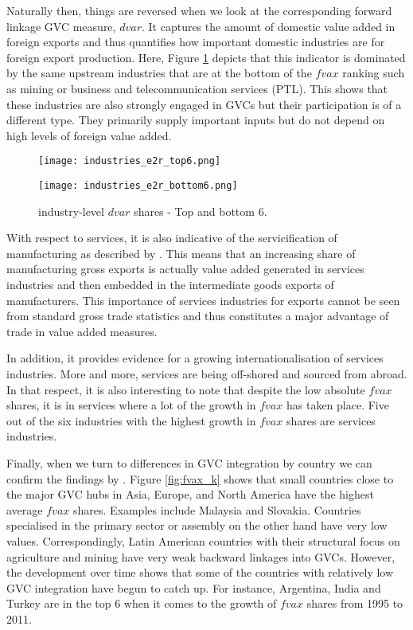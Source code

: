 \documentclass[a4paper,11pt]{article}
\begin{document}
Naturally then, things are reversed when we look at the corresponding forward linkage GVC measure, $dvar$. It captures the amount of domestic value added in foreign exports and thus quantifies how important domestic industries are for foreign export production. Here, Figure \ref{fig:dvar_s} depicts that this indicator is dominated by the same upstream industries that are at the bottom of the $fvax$ ranking such as mining or business and telecommunication services (PTL). This shows that these industries are also strongly engaged in GVCs but their participation is of a different type. They primarily supply important inputs but do not depend on high levels of foreign value added. 

\begin{figure}
\centering
\begin{minipage}{0.45\textwidth}
\centering
\texttt{[image: industries\_e2r\_top6.png]}
\end{minipage}\hfill
\begin{minipage}{0.45\textwidth}
\centering
\texttt{[image: industries\_e2r\_bottom6.png]}
\end{minipage}
\caption{industry-level $dvar$ shares - Top and bottom 6.}
\label{fig:dvar_s}
\end{figure}

With respect to services, it is also indicative of the servicification of manufacturing as described by \citet{ribaetal15}. This means that an increasing share of manufacturing gross exports is actually value added generated in services industries and then embedded in the intermediate goods exports of manufacturers. This importance of services industries for exports cannot be seen from standard gross trade statistics and thus constitutes a major advantage of trade in value added measures. 

In addition, it provides evidence for a growing internationalisation of services industries. More and more, services are being off-shored and sourced from abroad. In that respect, it is also interesting to note that despite the low absolute $fvax$ shares, it is in services where a lot of the growth in $fvax$ has taken place. Five out of the six industries with the highest growth in $fvax$ shares are services industries.

Finally, when we turn to differences in GVC integration by country we can confirm the findings by \citet{ribajalo15}. Figure \ref{fig:fvax_k} shows that small countries close to the major GVC hubs in Asia, Europe, and North America have the highest average $fvax$ shares. Examples include Malaysia and Slovakia. Countries specialised in the primary sector or assembly on the other hand have very low values. Correspondingly, Latin American countries with their structural focus on agriculture and mining have very weak backward linkages into GVCs. However, the development over time shows that some of the countries with relatively low GVC integration have begun to catch up. For instance, Argentina, India and Turkey are in the top 6 when it comes to the growth of $fvax$ shares from 1995 to 2011.
\end{document}
